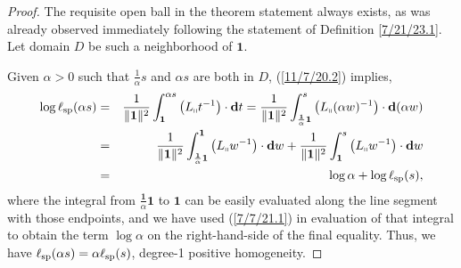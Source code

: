 \documentclass{amsart}
\theoremstyle{definition}
\numberwithin{theorem}{section}
\numberwithin{equation}{section}
\begin{document}
\begin{proof}  The requisite open ball in the theorem statement always exists, as was already observed immediately following the statement of Definition \ref{7/21/23.1}.  Let domain $D$ be such a neighborhood of $\mathbf{1}$.

Given $\alpha>0$ such that $\frac{1}{\alpha}s$ and $\alpha s$ are both in $D$, (\ref{11/7/20.2}) implies,
\begin{eqnarray}\nonumber  \log\ell_{\rm sp}(\alpha s) &=&  \frac{1}{\|{\bf 1}\|^2}\int_{\bf 1}^{\alpha s} \left(L_{\shortparallel}t^{-1}\right)\cdot \mathbf{d}t = \frac{1}{\|{\bf 1}\|^2}\int_{\frac{\mathbf{1}}{\alpha}\mathbf{1}}^{s} \left(L_{\shortparallel}(\alpha w)^{-1}\right)\cdot \mathbf{d}(\alpha w)  \\ \nonumber &=& \frac{1}{\|{\bf 1}\|^2}\int_{\frac{\mathbf{1}}{\alpha} \mathbf{1}}^{\mathbf{1}} \left(L_{\shortparallel}w^{-1}\right)\cdot \mathbf{d}w  +  \frac{1}{\|{\bf 1}\|^2}\int_{\mathbf{1}}^{s} \left(L_{\shortparallel}w^{-1}\right)\cdot \mathbf{d}w  \\ &=&   \log\alpha + \log \ell_{\rm sp}(s), \label{4/2/23.1}
\end{eqnarray} where the integral from $\frac{\mathbf{1}}{\alpha} \mathbf{1}$ to $\mathbf{1}$ can be easily evaluated along the line segment with those endpoints, and we have used (\ref{7/7/21.1}) in evaluation of that integral to  obtain the term $\log \alpha$ on the right-hand-side of the final equality.  Thus, we have $\ell_{\rm sp}(\alpha s) = \alpha\ell_{\rm sp}(s)$, degree-1 positive homogeneity.



\end{proof}
\end{document}
